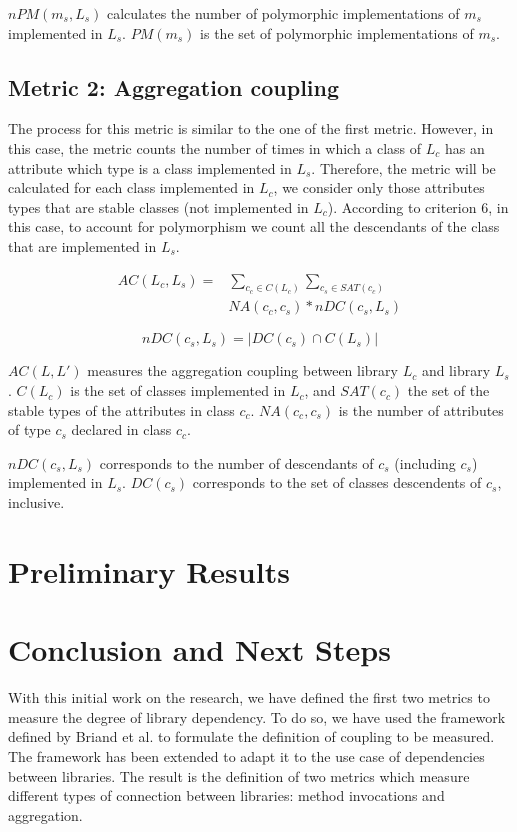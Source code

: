\documentclass[a4paper]{article}
\begin{document}
$nPM(m_s,L_s)$ calculates the number of polymorphic implementations of $m_s$ implemented in $L_s$. $PM(m_s)$ is the set of polymorphic implementations of $m_s$.

\subsection{Metric 2: Aggregation coupling}
The process for this metric is similar to the one of the first metric. However, in this case, the metric counts the number of times in which a class of $L_c$ has an attribute which type is a class implemented in $L_s$. Therefore, the metric will be calculated for each class implemented in $L_c$, we consider only those attributes types that are stable classes (not implemented in $L_c$). According to criterion 6, in this case, to account for polymorphism we count all the descendants of the class that are implemented in $L_s$.

\begin{equation}
\begin{aligned}
  AC(L_c,L_s) = &\sum_{c_c \in C(L_c)} \sum_{c_s \in SAT(c_c)}\\& NA(c_c, c_s)*nDC(c_s, L_s)
\end{aligned}
\end{equation}

\begin{equation}
    nDC(c_s, L_s) = |DC(c_s) \cap C(L_s)|
\end{equation}

$AC(L,L')$ measures the aggregation coupling between library $L_c$ and library $L_s$. $C(L_c)$ is the set of classes implemented in $L_c$, and $SAT(c_c)$ the set of the stable types of the attributes in class $c_c$. $NA(c_c,c_s)$ is the number of attributes of type $c_s$ declared in class $c_c$.

$nDC(c_s,L_s)$ corresponds to the number of descendants of $c_s$ (including $c_s$) implemented in $L_s$. $DC(c_s)$ corresponds to the set of classes descendents of $c_s$, inclusive.

\section{Preliminary Results}



\section{Conclusion and Next Steps}
With this initial work on the research, we have defined the first two metrics to measure the degree of library dependency. To do so, we have used the framework defined by Briand et al. to formulate the definition of coupling to be measured. The framework has been extended to adapt it to the use case of dependencies between libraries. The result is the definition of two metrics which measure different types of connection between libraries: method invocations and aggregation.
\end{document}

